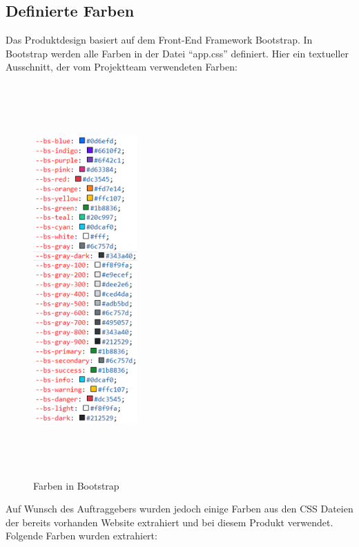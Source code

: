\subsection{Definierte Farben}
Das Produktdesign basiert auf dem Front-End Framework Bootstrap. In Bootstrap werden alle Farben in der Datei “app.css” definiert. Hier ein textueller Ausschnitt, der vom Projektteam verwendeten Farben:
\\
\begin{figure}[h]
	\centering
	\includegraphics[height=15cm,width=4cm]{images/DefinierteFarben}
	\caption{Farben in Bootstrap}
	\label{fig: Farben in Bootstrap}
\end{figure}
\newpage
Auf Wunsch des Auftraggebers wurden jedoch einige Farben aus den CSS Dateien der bereits vorhanden Website extrahiert und bei diesem Produkt verwendet. Folgende Farben wurden extrahiert:
\\
\\
